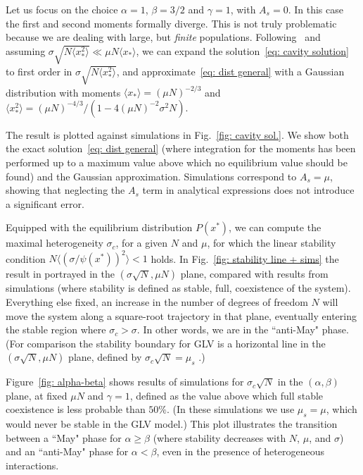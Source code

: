 Let us focus on the choice 
$\alpha=1$, $\beta=3/2$ and $\gamma=1$, with
$A_s=0$. 
In this case the first and second moments formally diverge.
This is not truly problematic because we are dealing with large, but \emph{finite} populations.
Following~\cite{Cui2020,Hatton2023} and assuming
$\sigma \sqrt{N\langle x_*^2\rangle}\ll \mu N \langle x_* \rangle$,
we can expand the  
solution~\eqref{eq: cavity solution} to first order in 
$\sigma \sqrt{N\langle x_*^2\rangle}$, and 
approximate~\eqref{eq: dist general} with
a Gaussian distribution with moments $\langle x_*\rangle=(\mu N)^{-2/3}$ and $\langle x_*^2\rangle=(\mu N)^{-4/3}/(1-4(\mu N)^{-2}\sigma^2N)$. 

The result is plotted against simulations in 
Fig.~\ref{fig: cavity sol.}. We show both the exact 
solution~\eqref{eq: dist general} 
(where integration for the moments has been performed up to a maximum
value above which no equilibrium value should 
be found) and the Gaussian approximation.
Simulations correspond to $A_s=\mu$, showing that neglecting the $A_s$ term in analytical expressions does not introduce a significant error. 

Equipped with the equilibrium distribution $P(x^*)$, we can compute the maximal heterogeneity 
$\sigma_c$, for a given $N$ and $\mu$, for which the linear stability condition $N\langle (\sigma/\psi(x^*))^2\rangle < 1$ holds. In Fig.~\ref{fig: stability line + sims} the result in portrayed in the $(\sigma \sqrt{N},\mu N)$ plane,
compared with results from simulations (where stability is defined
as stable, full, coexistence of the system).
Everything else fixed, an increase in the number of
degrees of freedom $N$ will move the system along a square-root
trajectory in that plane, eventually entering the stable region where $\sigma_c > \sigma$. 
In other words, we are in the
``anti-May" phase.
(For comparison the stability boundary for GLV is a horizontal line in the $(\sigma \sqrt{N},\mu N)$ plane, defined by $\sigma_c\sqrt{N} = \mu_s$ \cite{bunin2017ecological}.)


Figure~\ref{fig: alpha-beta} shows results of simulations 
for $\sigma_c\sqrt{N}$ in the $(\alpha,\beta)$ plane, 
at fixed $\mu N$ and $\gamma = 1$, 
defined as the value above which
full stable coexistence is less probable than $50\%$.
(In these simulations we use $\mu_s = \mu$, which would never be stable in the GLV model.) This plot illustrates the transition between a ``May" phase for $\alpha \geq \beta$ (where stability decreases with $N$, $\mu$, and $\sigma$) and an ``anti-May" phase for $\alpha < \beta$, even in the presence of heterogeneous interactions. 

